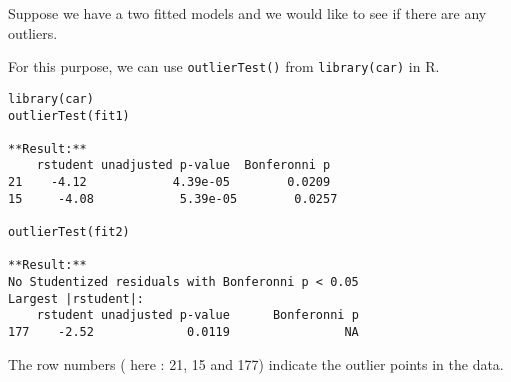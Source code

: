

Suppose we have a two fitted models and we would like to see if there are any outliers. 

For this purpose, we can use \texttt{outlierTest()} from \texttt{library(car)} in R. 



\begin{framed}
\begin{verbatim}
library(car)
outlierTest(fit1)   

**Result:**
    rstudent unadjusted p-value  Bonferonni p
21    -4.12            4.39e-05        0.0209
15     -4.08            5.39e-05        0.0257

outlierTest(fit2)   

**Result:**
No Studentized residuals with Bonferonni p < 0.05
Largest |rstudent|:
    rstudent unadjusted p-value      Bonferonni p
177    -2.52             0.0119                NA
\end{verbatim}
\end{framed}

The row numbers ( here : 21, 15 and 177) indicate the outlier points in the data.



